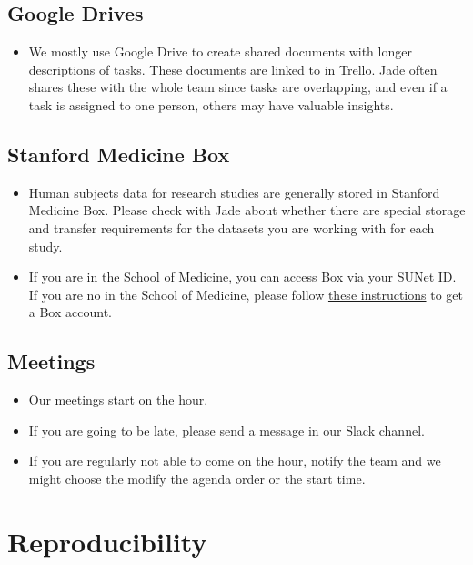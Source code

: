 \documentclass[
]{book}
\providecommand{\tightlist}{%
  \setlength{\itemsep}{0pt}\setlength{\parskip}{0pt}}
\begin{document}
\section{Google Drives}\label{google-drives}

\begin{itemize}
\tightlist
\item
  We mostly use Google Drive to create shared documents with longer descriptions of tasks. These documents are linked to in Trello. Jade often shares these with the whole team since tasks are overlapping, and even if a task is assigned to one person, others may have valuable insights.
\end{itemize}

\section{Stanford Medicine Box}\label{stanford-medicine-box}

\begin{itemize}
\tightlist
\item
  Human subjects data for research studies are generally stored in Stanford Medicine Box. Please check with Jade about whether there are special storage and transfer requirements for the datasets you are working with for each study.
\item
  If you are in the School of Medicine, you can access Box via your SUNet ID. If you are no in the School of Medicine, please follow \href{https://docs.google.com/document/d/1R3Ngpi8LsezHU0KhgllSKh_XJtQafczrZe3pmeWH2jY/edit?usp=sharing}{these instructions} to get a Box account.
\end{itemize}

\section{Meetings}\label{meetings}

\begin{itemize}
\tightlist
\item
  Our meetings start on the hour.
\item
  If you are going to be late, please send a message in our Slack channel.
\item
  If you are regularly not able to come on the hour, notify the team and we might choose the modify the agenda order or the start time.
\end{itemize}

\chapter{Reproducibility}\label{reproducibility}
\end{document}
